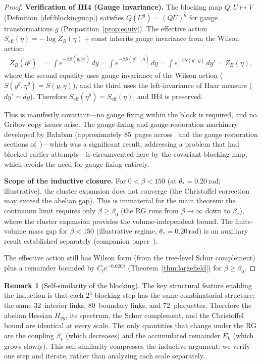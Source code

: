 \documentclass[11pt]{article}
\theoremstyle{definition}
\newtheorem{remark}[theorem]{Remark}
\begin{document}
\begin{proof}
\medskip\noindent\textbf{Verification of IH4 (Gauge invariance).}
The blocking map $Q:U\mapsto V$ (Definition~\ref{def:blockingmap})
satisfies $Q(U^g)=(QU)^{\bar g}$ for gauge transformations $g$
(Proposition~\ref{prop:equiv}).  The effective action
$S_{\mathrm{eff}}(\eta)=-\log Z_B(\eta)+\mathrm{const}$ inherits
gauge invariance from the Wilson action:
\begin{align}
Z_B(\eta^{\bar g})
&=\int e^{-\beta S(y,\eta^{\bar g})}\,dy
=\int e^{-\beta S(y^{g^{-1}},\eta)}\,dy
=\int e^{-\beta S(y',\eta)}\,dy'
=Z_B(\eta),
\end{align}
where the second equality uses gauge invariance of the Wilson action
($S(y^g,\eta^{\bar g})=S(y,\eta)$), and the third uses the
left-invariance of Haar measure ($dy'=dy$).  Therefore
$S_{\mathrm{eff}}(\eta^{\bar g})=S_{\mathrm{eff}}(\eta)$, and IH4
is preserved.

This is manifestly covariant---no gauge fixing within the block is
required, and no Gribov copy issues arise.  The gauge-fixing
and gauge-restoration machinery developed by Ba\l aban
(approximately 85~pages
across~\cite{BalabanAvg,BalabanVar} and the gauge restoration
sections of~\cite{BalabanI,BalabanII})---which was a
significant result, addressing a problem
that had blocked earlier attempts---is circumvented here
by the covariant blocking map, which avoids the need
for gauge fixing entirely.

\medskip\noindent\textbf{Scope of the inductive closure.}
For $0<\beta<150$ (at $\theta_*=0.20$\,rad; illustrative), the cluster expansion does not converge
(the Christoffel correction may exceed the abelian gap).
This is immaterial for the main theorem: the continuum limit
requires only $\beta\ge\beta_0$ (the RG runs from $\beta\to\infty$
down to $\beta_*$), where the cluster expansion provides
the volume-independent bound.  The finite-volume mass gap
for $\beta<150$ (illustrative regime, $\theta_*=0.20$\,rad) is an auxiliary result established separately
(companion paper~\cite{companion}).

The effective action still has Wilson form (from the tree-level Schur
complement) plus a remainder bounded by $C_l e^{-0.020\beta}$
(Theorem~\ref{thm:largefield}) for $\beta\ge\beta_0$.
\end{proof}

\begin{remark}[Self-similarity of the blocking]\label{rem:selfsim}
The key structural feature enabling the induction is that each $2^4$
blocking step has the same combinatorial structure: the same
32~interior links, 80~boundary links, and 72~plaquettes.  Therefore
the abelian Hessian $H_{yy}$, its spectrum, the Schur complement,
and the Christoffel bound are identical at every
scale.  The only quantities that change under the RG are the coupling
$\beta_k$ (which decreases) and the accumulated remainder $E_k$
(which grows slowly).  This self-similarity compresses the inductive
argument: we verify one step and iterate, rather than analyzing each
scale separately.
\end{remark}
\end{document}
